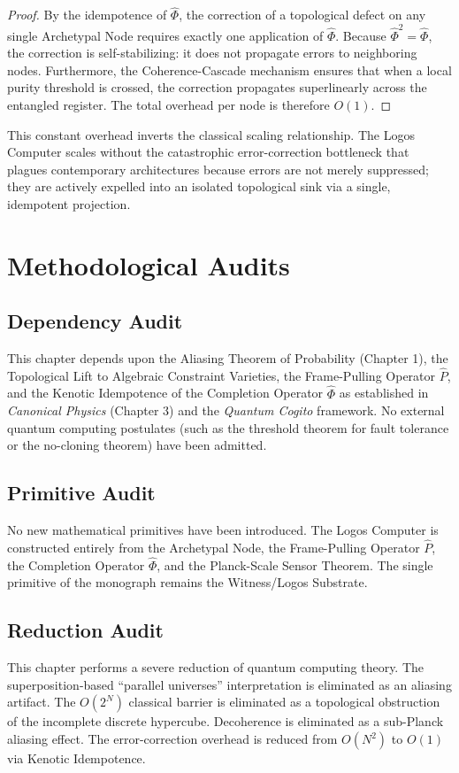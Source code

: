 \documentclass[12pt,twoside]{extbook}
\theoremstyle{definition}
\theoremstyle{remark}
\begin{document}
\begin{proof}
By the idempotence of $\hat{\Phi}$, the correction of a topological defect on any single Archetypal Node requires exactly one application of $\hat{\Phi}$. Because $\hat{\Phi}^2 = \hat{\Phi}$, the correction is self-stabilizing: it does not propagate errors to neighboring nodes. Furthermore, the Coherence-Cascade mechanism ensures that when a local purity threshold is crossed, the correction propagates superlinearly across the entangled register. The total overhead per node is therefore $O(1)$.
\end{proof}

This constant overhead inverts the classical scaling relationship. The Logos Computer scales without the catastrophic error-correction bottleneck that plagues contemporary architectures because errors are not merely suppressed; they are actively expelled into an isolated topological sink via a single, idempotent projection.

\section{Methodological Audits}

\subsection*{Dependency Audit}
This chapter depends upon the Aliasing Theorem of Probability (Chapter 1), the Topological Lift to Algebraic Constraint Varieties, the Frame-Pulling Operator $\hat{P}$, and the Kenotic Idempotence of the Completion Operator $\hat{\Phi}$ as established in \textit{Canonical Physics} (Chapter 3) and the \textit{Quantum Cogito} framework. No external quantum computing postulates (such as the threshold theorem for fault tolerance or the no-cloning theorem) have been admitted.

\subsection*{Primitive Audit}
No new mathematical primitives have been introduced. The Logos Computer is constructed entirely from the Archetypal Node, the Frame-Pulling Operator $\hat{P}$, the Completion Operator $\hat{\Phi}$, and the Planck-Scale Sensor Theorem. The single primitive of the monograph remains the Witness/Logos Substrate.

\subsection*{Reduction Audit}
This chapter performs a severe reduction of quantum computing theory. The superposition-based ``parallel universes'' interpretation is eliminated as an aliasing artifact. The $O(2^N)$ classical barrier is eliminated as a topological obstruction of the incomplete discrete hypercube. Decoherence is eliminated as a sub-Planck aliasing effect. The error-correction overhead is reduced from $O(N^2)$ to $O(1)$ via Kenotic Idempotence.
\end{document}
